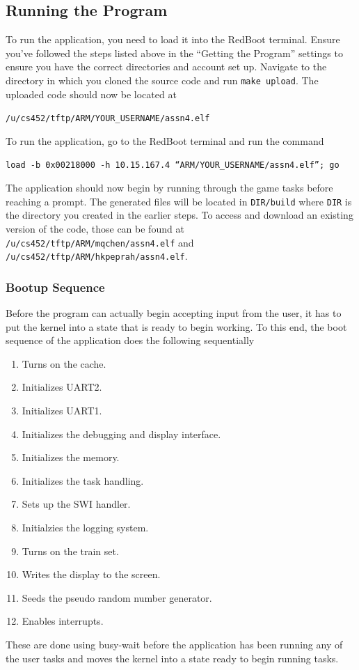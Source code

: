 \documentclass[12pt]{article}
\begin{document}
\subsection{Running the Program}
To run the application, you need to load it into the RedBoot terminal.  Ensure you've followed the steps listed above in the ``Getting the Program'' settings to ensure you have the correct directories and account set up.  Navigate to the directory in which you cloned the source code and run \texttt{make upload}.  The uploaded code should now be located at
\begin{center}
  \texttt{/u/cs452/tftp/ARM/YOUR\_USERNAME/assn4.elf}
\end{center}
To run the application, go to the RedBoot terminal and run the command
\begin{center}
  \texttt{load -b 0x00218000 -h 10.15.167.4 ``ARM/YOUR\_USERNAME/assn4.elf''; go}
\end{center}
The application should now begin by running through the game tasks before reaching a prompt.  The generated files will be located in \texttt{DIR/build} where \texttt{DIR} is the directory you created in the earlier steps.  To access and download an existing version of the code, those can be found at \texttt{/u/cs452/tftp/ARM/mqchen/assn4.elf} and \texttt{/u/cs452/tftp/ARM/hkpeprah/assn4.elf}.
\\
\subsubsection{Bootup Sequence}
Before the program can actually begin accepting input from the user, it has to put the kernel into a state that is ready to begin working.  To this end, the boot sequence of the application does the following sequentially
\begin{enumerate}[label={\bf \arabic*.}, leftmargin=1cm]
  \item Turns on the cache.
  \item Initializes UART2.
  \item Initializes UART1.
  \item Initializes the debugging and display interface.
  \item Initializes the memory.
  \item Initializes the task handling.
  \item Sets up the SWI handler.
  \item Initialzies the logging system.
  \item Turns on the train set.
  \item Writes the display to the screen.
  \item Seeds the pseudo random number generator.
  \item Enables interrupts.
\end{enumerate}
These are done using busy-wait before the application has been running any of the user tasks and moves the kernel into a state ready to begin running tasks.
\\
\end{document}
